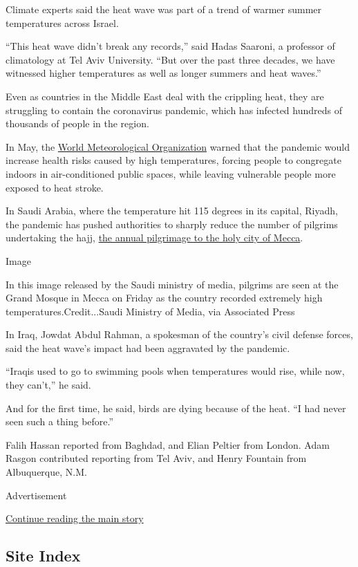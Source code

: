 Climate experts said the heat wave was part of a trend of warmer summer
temperatures across Israel.

``This heat wave didn't break any records,'' said Hadas Saaroni, a
professor of climatology at Tel Aviv University. ``But over the past
three decades, we have witnessed higher temperatures as well as longer
summers and heat waves.''

Even as countries in the Middle East deal with the crippling heat, they
are struggling to contain the coronavirus pandemic, which has infected
hundreds of thousands of people in the region.

In May, the
\href{https://public.wmo.int/en/media/news/global-partnership-urges-stronger-preparation-hot-weather-during-covid-19}{World
Meteorological Organization} warned that the pandemic would increase
health risks caused by high temperatures, forcing people to congregate
indoors in air-conditioned public spaces, while leaving vulnerable
people more exposed to heat stroke.

In Saudi Arabia, where the temperature hit 115 degrees in its capital,
Riyadh, the pandemic has pushed authorities to sharply reduce the number
of pilgrims undertaking the hajj,
\href{https://www.nytimes.com/2020/07/30/world/middleeast/pilgrims-hajj-mecca-coronavirus-pandemic.html}{the
annual pilgrimage to the holy city of Mecca}.

Image

In this image released by the Saudi ministry of media, pilgrims are seen
at the Grand Mosque in Mecca on Friday as the country recorded extremely
high temperatures.Credit...Saudi Ministry of Media, via Associated Press

In Iraq, Jowdat Abdul Rahman, a spokesman of the country's civil defense
forces, said the heat wave's impact had been aggravated by the pandemic.

``Iraqis used to go to swimming pools when temperatures would rise,
while now, they can't,'' he said.

And for the first time, he said, birds are dying because of the heat.
``I had never seen such a thing before.''

Falih Hassan reported from Baghdad, and Elian Peltier from London. Adam
Rasgon contributed reporting from Tel Aviv, and Henry Fountain from
Albuquerque, N.M.

Advertisement

\protect\hyperlink{after-bottom}{Continue reading the main story}

\hypertarget{site-index}{%
\subsection{Site Index}\label{site-index}}

